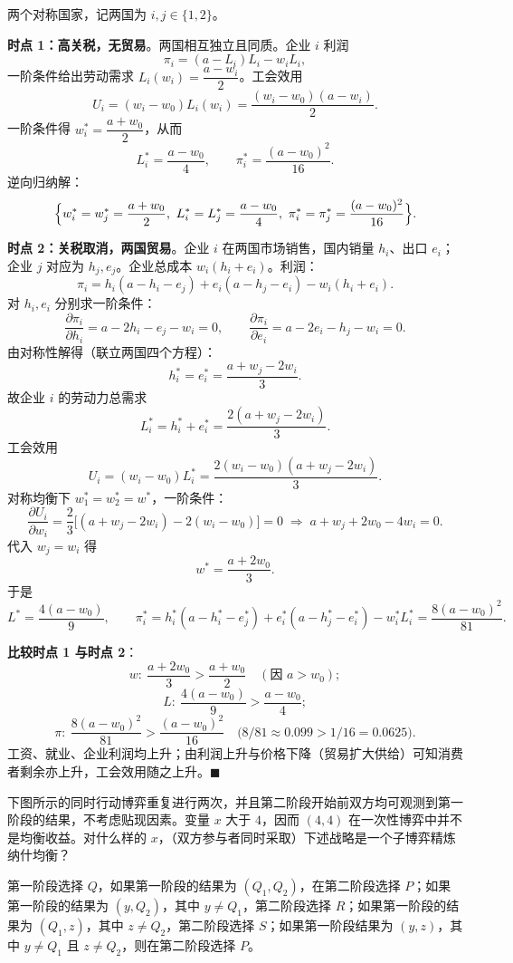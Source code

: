 \sol
两个对称国家，记两国为 $i,j\in\{1,2\}$。

\textbf{时点 1：高关税，无贸易}。两国相互独立且同质。企业 $i$ 利润
\[
\pi_i=(a-L_i)L_i-w_iL_i,
\]\indent
一阶条件给出劳动需求 $L_i(w_i)=\dfrac{a-w_i}{2}$。工会效用
\[
U_i=(w_i-w_0)L_i(w_i)=\frac{(w_i-w_0)(a-w_i)}{2}.
\]\indent
一阶条件得 $w_i^*=\dfrac{a+w_0}{2}$，从而
\[
L_i^*=\frac{a-w_0}{4},\qquad
\pi_i^*=\frac{(a-w_0)^2}{16}.
\]\indent
逆向归纳解：
\[
\Bigl\{w_i^*=w_j^*=\frac{a+w_0}{2},\ L_i^*=L_j^*=\frac{a-w_0}{4},\ \pi_i^*=\pi_j^*=\frac{(a-w_0)^2}{16}\Bigr\}.
\]

\textbf{时点 2：关税取消，两国贸易}。企业 $i$ 在两国市场销售，国内销量 $h_i$、出口 $e_i$；企业 $j$ 对应为 $h_j,e_j$。企业总成本 $w_i(h_i+e_i)$。利润：
\[
\pi_i=h_i(a-h_i-e_j)+e_i(a-h_j-e_i)-w_i(h_i+e_i).
\]\indent
对 $h_i,e_i$ 分别求一阶条件：
\[
\frac{\partial\pi_i}{\partial h_i}=a-2h_i-e_j-w_i=0,\qquad
\frac{\partial\pi_i}{\partial e_i}=a-2e_i-h_j-w_i=0.
\]\indent
由对称性解得（联立两国四个方程）：
\[
h_i^*=e_i^*=\frac{a+w_j-2w_i}{3}.
\]\indent
故企业 $i$ 的劳动力总需求
\[
L_i^*=h_i^*+e_i^*=\frac{2(a+w_j-2w_i)}{3}.
\]\indent
工会效用
\[
U_i=(w_i-w_0)L_i^*
=\frac{2(w_i-w_0)(a+w_j-2w_i)}{3}.
\]\indent
对称均衡下 $w_1^*=w_2^*=w^*$，一阶条件：
\[
\frac{\partial U_i}{\partial w_i}=\frac{2}{3}\bigl[(a+w_j-2w_i)-2(w_i-w_0)\bigr]=0
\;\Longrightarrow\;
a+w_j+2w_0-4w_i=0.
\]\indent
代入 $w_j=w_i$ 得
\[
w^*=\frac{a+2w_0}{3}.
\]\indent
于是
\[
L^*=\frac{4(a-w_0)}{9},\qquad
\pi_i^*=h_i^*(a-h_i^*-e_j^*)+e_i^*(a-h_j^*-e_i^*)-w_i^*L_i^*
=\frac{8(a-w_0)^2}{81}.
\]

\textbf{比较时点 1 与时点 2}：
\[
w:\ \frac{a+2w_0}{3}>\frac{a+w_0}{2}\quad(\text{因 }a>w_0);
\]\indent
\[
L:\ \frac{4(a-w_0)}{9}>\frac{a-w_0}{4};
\]\indent
\[
\pi:\ \frac{8(a-w_0)^2}{81}>\frac{(a-w_0)^2}{16}\quad\bigl(8/81\approx0.099>1/16=0.0625\bigr).
\]\indent
工资、就业、企业利润均上升；由利润上升与价格下降（贸易扩大供给）可知消费者剩余亦上升，工会效用随之上升。$\blacksquare$


下图所示的同时行动博弈重复进行两次，并且第二阶段开始前双方均可观测到第一阶段的结果，不考虑贴现因素。变量 $x$ 大于 $4$，因而 $(4,4)$ 在一次性博弈中并不是均衡收益。对什么样的 $x$，（双方参与者同时采取）下述战略是一个子博弈精炼纳什均衡？

第一阶段选择 $Q$，如果第一阶段的结果为 $(Q_1,Q_2)$，在第二阶段选择 $P$；如果第一阶段的结果为 $(y,Q_2)$，其中 $y\neq Q_1$，第二阶段选择 $R$；如果第一阶段的结果为 $(Q_1,z)$，其中 $z\neq Q_2$，第二阶段选择 $S$；如果第一阶段结果为 $(y,z)$，其中 $y\neq Q_1$ 且 $z\neq Q_2$，则在第二阶段选择 $P$。

